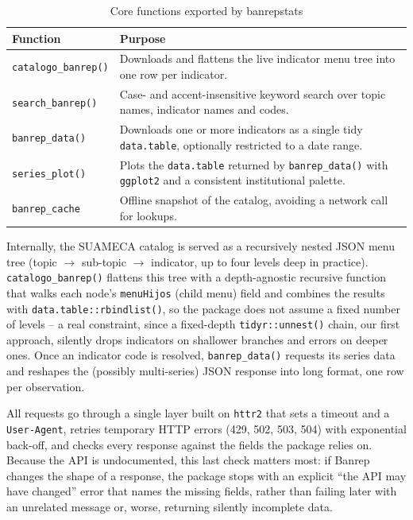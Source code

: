 \documentclass[conference]{IEEEtran}
\begin{document}
\begin{table}[htbp]
\caption{Core functions exported by banrepstats}
\begin{center}
\begin{tabular}{lp{5.1cm}}
\toprule
\textbf{Function} & \textbf{Purpose} \\
\midrule
\texttt{catalogo\_banrep()} & Downloads and flattens the live indicator menu tree into one row per indicator. \\
\texttt{search\_banrep()} & Case- and accent-insensitive keyword search over topic names, indicator names and codes. \\
\texttt{banrep\_data()} & Downloads one or more indicators as a single tidy \texttt{data.table}, optionally restricted to a date range. \\
\texttt{series\_plot()} & Plots the \texttt{data.table} returned by \texttt{banrep\_data()} with \texttt{ggplot2} \cite{b_wickham} and a consistent institutional palette. \\
\texttt{banrep\_cache} & Offline snapshot of the catalog, avoiding a network call for lookups. \\
\bottomrule
\end{tabular}
\label{tab:api}
\end{center}
\end{table}

Internally, the SUAMECA catalog is served as a recursively nested JSON
menu tree (topic $\rightarrow$ sub-topic $\rightarrow$ indicator, up to
four levels deep in practice). \texttt{catalogo\_banrep()} flattens this
tree with a depth-agnostic recursive function that walks each node's
\texttt{menuHijos} (child menu) field and combines the results with
\texttt{data.table::\allowbreak rbindlist()}, so the package does not assume a fixed
number of levels -- a real constraint, since a fixed-depth
\texttt{tidyr::unnest()} chain, our first approach, silently drops
indicators on shallower branches and errors on deeper ones. Once an
indicator code is resolved, \texttt{banrep\_data()} requests its series
data and reshapes the (possibly multi-series) JSON response into long
format, one row per observation.

All requests go through a single layer built on \texttt{httr2}
\cite{b_httr2} that sets a timeout and a \texttt{User-Agent}, retries
temporary HTTP errors (429, 502, 503, 504) with exponential back-off,
and checks every response against the fields the package relies on.
Because the API is undocumented, this last check matters most: if Banrep
changes the shape of a response, the package stops with an explicit
``the API may have changed'' error that names the missing fields, rather
than failing later with an unrelated message or, worse, returning
silently incomplete data.
\end{document}
